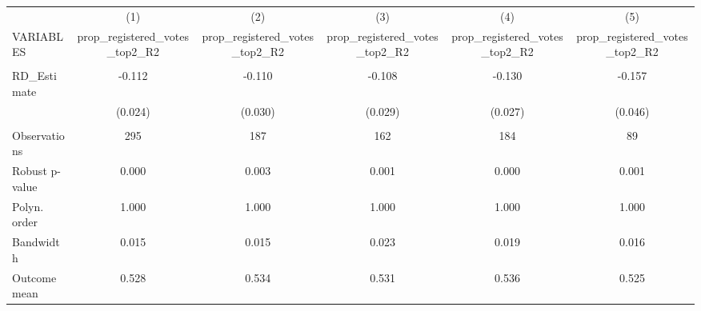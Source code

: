 \documentclass[]{article}
\begin{document}
\begin{tabular}{lccccc} \hline
 & (1) & (2) & (3) & (4) & (5) \\
VARIABLES & prop\_registered\_votes\_top2\_R2 & prop\_registered\_votes\_top2\_R2 & prop\_registered\_votes\_top2\_R2 & prop\_registered\_votes\_top2\_R2 & prop\_registered\_votes\_top2\_R2 \\ \hline
 &  &  &  &  &  \\
RD\_Estimate & -0.112 & -0.110 & -0.108 & -0.130 & -0.157 \\
 & (0.024) & (0.030) & (0.029) & (0.027) & (0.046) \\
 &  &  &  &  &  \\
Observations & 295 & 187 & 162 & 184 & 89 \\
Robust p-value & 0.000 & 0.003 & 0.001 & 0.000 & 0.001 \\
Polyn. order & 1.000 & 1.000 & 1.000 & 1.000 & 1.000 \\
Bandwidth & 0.015 & 0.015 & 0.023 & 0.019 & 0.016 \\
 Outcome mean & 0.528 & 0.534 & 0.531 & 0.536 & 0.525 \\ \hline
\end{tabular}
\end{document}
